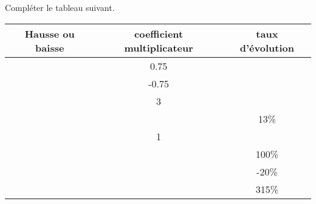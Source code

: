 
\begin{exercice}\label{exosmath-0101}

    Compléter le tableau suivant.

    \begin{center}
    \begin{tabular}[]{|c||c|c|}
        \hline
        Hausse ou baisse&coefficient multiplicateur&taux d'évolution\\
        \hline\hline
        &0.75&\\
        \hline
        &-0.75&\\
        \hline
        &3&\\
        \hline
        &&13\%\\
        \hline
        &1&\\
        \hline
        &&100\%\\
        \hline
        &&-20\%\\
        \hline
        &&315\%\\
        \hline
    \end{tabular}
        
    \end{center}
    

\end{exercice}
